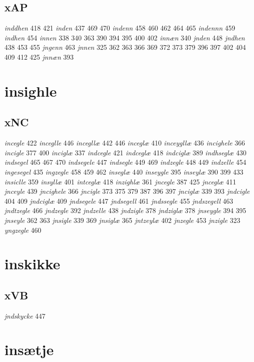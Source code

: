 \documentclass[a4paper,twocolumn]{article}
\begin{document}
\subsection{xAP}
\label{sec:org2dc39cb}
\emph{inddhen} 418 421 \emph{inden} 437 469 470 \emph{indenn} 458 460 462 464 465 \emph{indennn} 459 \emph{indhen} 454 \emph{innen} 338 340 363 390 394 395 400 402 \emph{innæn} 340 \emph{jnden} 448 \emph{jndhen} 438 453 455 \emph{jngenn} 463 \emph{jnnen} 325 362 363 366 369 372 373 379 396 397 402 404 409 412 425 \emph{jnnæn} 393 
\section{insighle}
\label{sec:org9bfd2dc}
\subsection{xNC}
\label{sec:org577a656}
\emph{incegle} 422 \emph{inceglle} 446 \emph{incegllæ} 442 446 \emph{inceglæ} 410 \emph{inceygllæ} 436 \emph{incighele} 366 \emph{incigle} 377 400 \emph{inciglæ} 337 \emph{indcegle} 421 \emph{indceglæ} 418 \emph{indciglæ} 389 \emph{indhseglæ} 430 \emph{indsegel} 465 467 470 \emph{indsegele} 447 \emph{indsegle} 449 469 \emph{indzegle} 448 449 \emph{indzelle} 454 \emph{ingesegel} 435 \emph{ingzegle} 458 459 462 \emph{inseglæ} 440 \emph{inseygle} 395 \emph{inseylæ} 390 399 433 \emph{insiclle} 359 \emph{insyllæ} 401 \emph{intceglæ} 418 \emph{inzighlæ} 361 \emph{jncegle} 387 425 \emph{jnceglæ} 411 \emph{jnceyle} 439 \emph{jncighele} 366 \emph{jncigle} 373 375 379 387 396 397 \emph{jnciglæ} 339 393 \emph{jndcigle} 404 409 \emph{jndciglæ} 409 \emph{jndsegele} 447 \emph{jndsegell} 461 \emph{jndssegle} 455 \emph{jndszegell} 463 \emph{jndtzegle} 466 \emph{jndzegle} 392 \emph{jndzelle} 438 \emph{jndzigle} 378 \emph{jndziglæ} 378 \emph{jnseygle} 394 395 \emph{jnseyle} 362 363 \emph{jnsigle} 339 369 \emph{jnsiglæ} 365 \emph{jntzeylæ} 402 \emph{jnzegle} 453 \emph{jnzigle} 323 \emph{yngzegle} 460 
\section{inskikke}
\label{sec:orgfd3eb54}
\subsection{xVB}
\label{sec:org7cb501d}
\emph{jndskycke} 447 
\section{insætje}
\label{sec:orgb49428d}
\end{document}
